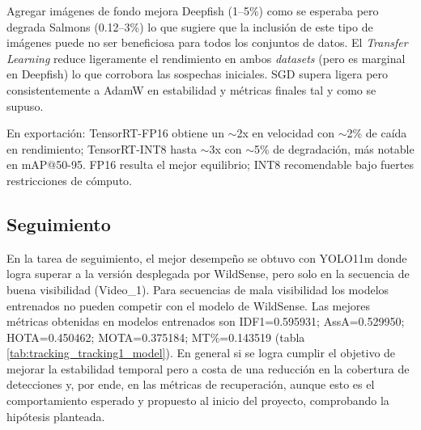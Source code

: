 Agregar imágenes de fondo mejora Deepfish (1--5\%) como se esperaba pero degrada Salmons (0.12--3\%) lo que sugiere que la inclusión de este tipo de imágenes puede no ser beneficiosa para todos los conjuntos de datos. El \textit{Transfer Learning} reduce ligeramente el rendimiento en ambos \textit{datasets} (pero es marginal en Deepfish) lo que corrobora las sospechas iniciales. SGD supera ligera pero consistentemente a AdamW en estabilidad y métricas finales tal y como se supuso.

En exportación: TensorRT-FP16 obtiene un $\sim$2x en velocidad con $\sim$2\% de caída en rendimiento; TensorRT-INT8 hasta $\sim$3x con $\sim$5\% de degradación, más notable en mAP@50-95. FP16 resulta el mejor equilibrio; INT8 recomendable bajo fuertes restricciones de cómputo.

\subsection{Seguimiento}
En la tarea de seguimiento, el mejor desempeño se obtuvo con YOLO11m donde logra superar a la versión desplegada por WildSense, pero solo en la secuencia de buena visibilidad (Video\_1). Para secuencias de mala visibilidad los modelos entrenados no pueden competir con el modelo de WildSense. Las mejores métricas obtenidas en modelos entrenados son IDF1=0.595931; AssA=0.529950; HOTA=0.450462; MOTA=0.375184; MT\%=0.143519 (tabla \ref{tab:tracking_tracking1_model}). En general si se logra cumplir el objetivo de mejorar la estabilidad temporal pero a costa de una reducción en la cobertura de detecciones y, por ende, en las métricas de recuperación, aunque esto es el comportamiento esperado y propuesto al inicio del proyecto, comprobando la hipótesis planteada.

